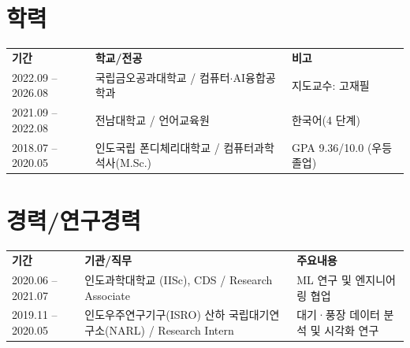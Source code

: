 \documentclass[10pt, letterpaper]{article}
\begin{document}
	
	\section{학력}
	\begin{tabularx}{\textwidth}{@{}L{3.2cm}Y L{4.5cm}@{}}
		\textbf{기간} & \textbf{학교/전공} & \textbf{비고} \\
		2022.09 -- 2026.08 & 국립금오공과대학교 / 컴퓨터$\cdot$AI융합공학과 & 지도교수: 고재필 \\
		2021.09 -- 2022.08 & 전남대학교 / 언어교육원 & 한국어(4 단계) \\
		2018.07 -- 2020.05 & 인도국립 폰디체리대학교 / 컴퓨터과학 석사(M.Sc.) & GPA 9.36/10.0 (우등 졸업) \\
	\end{tabularx}
	
	\section{경력/연구경력}
	\begin{tabularx}{\textwidth}{@{}L{3.2cm}Y L{4.5cm}@{}}
		\textbf{기간} & \textbf{기관/직무} & \textbf{주요내용} \\
		2020.06 -- 2021.07 & 인도과학대학교 (IISc), CDS / Research Associate & ML 연구 및 엔지니어링 협업 \\
		2019.11 -- 2020.05 & 인도우주연구기구(ISRO) 산하 국립대기연구소(NARL) / Research Intern & 대기·풍장 데이터 분석 및 시각화 연구 \\
	\end{tabularx}
	

	
\end{document}
